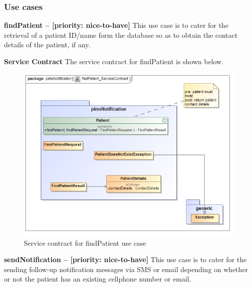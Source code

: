 \subsubsection{Use cases}
\begin{description}
	\item{\textbf{findPatient -- [priority: nice-to-have]}}
	This use case is to cater for the retrieval of a patient ID/name form the database so as to obtain the contact details of the patient, if any.
	\begin{description}
		\item{\textbf{Service Contract}} The service contract for findPatient is shown below.
		\begin{figure}[H]
			\centerline{\includegraphics[width=0.7\linewidth]{./Functional_Requirements/Graphics/pimsNotification/findPatient_ServiceContract}}
			\caption{Service contract for findPatient use case}
		\end{figure}
	\end{description}	
	
	\item{\textbf{sendNotification -- [priority: nice-to-have]}}
	This use case is to cater for the sending follow-up notification messages via SMS or email depending on whether or not the patient has an existing cellphone number or email.
	

\end{description}
